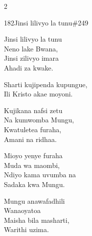 \begin{multicols}{2}
\begin{hymn}{182}{Jinsi lilivyo la tunu}{\#249}
\begin{stanza}
Jinsi lilivyo la tunu\\
Neno lake Bwana,\\
Jinsi zilivyo imara\\
Ahadi za kwake.
\end{stanza}
\begin{chorus}
Sharti kujipenda kupungue,\\
Ili Kristo akae moyoni.
\end{chorus}
\begin{stanza}
Kujikana nafsi zetu\\
Na kumwomba Mungu,\\
Kwatuletea furaha,\\
Amani na ridhaa.
\end{stanza}
\begin{stanza}
Mioyo yenye furaha\\
Muda wa maombi,\\
Ndiyo kama uvumba na\\
Sadaka kwa Mungu.
\end{stanza}
\begin{stanza}
Mungu anawafadhili\\
Wanaoyatoa\\
Maisha bila masharti,\\
Warithi uzima.
\end{stanza}
\end{hymn}


\end{multicols}
